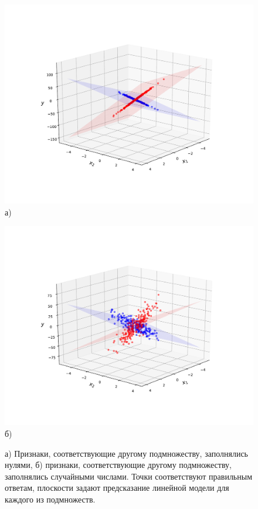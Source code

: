 \documentclass[12pt, twoside]{article}
\begin{document}
\begin{figure}[h]
\begin{center}
\begin{minipage}[h]{0.49\linewidth}
\begin{center}\includegraphics[width=1.2\linewidth]{experiment1-zeros.pdf}  а) \end{center}
\end{minipage}
\hfill
\begin{minipage}[h]{0.49\linewidth}
\begin{center}\includegraphics[width=1.2\linewidth]{experiment1-random.pdf}  б) \end{center}
\end{minipage}
\caption{а) Признаки, соответствующие другому подмножеству, заполнялись нулями, б) признаки, соответствующие другому подмножеству, заполнялись случайными числами. Точки соответствуют правильным ответам, плоскости задают предсказание линейной модели для каждого из подмножеств.}
\label{ris:image1}
\end{center}
\end{figure}
\end{document}
